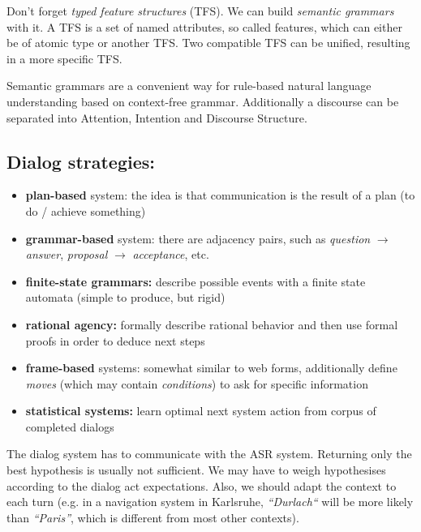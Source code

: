 \vspace{5pt}

Don't forget \textit{typed feature structures} (TFS). We can build \textit{semantic grammars} with it.
A TFS is a set of named attributes, so called features, which can either be of atomic type or another TFS.
Two compatible TFS can be unified, resulting in a more specific TFS.

Semantic grammars are a convenient way for rule-based natural language understanding based on context-free grammar.
Additionally a discourse can be separated into Attention, Intention and Discourse Structure.

\subsection{Dialog strategies:}
\begin{itemize}
    \item \textbf{plan-based} system: the idea is that communication is the result of a plan (to do / achieve something)
    \item \textbf{grammar-based} system: there are adjacency pairs, such as \textit{question} $\rightarrow$ \textit{answer}, \textit{proposal} $\rightarrow$ \textit{acceptance}, etc.
    \item \textbf{finite-state grammars:} describe possible events with a finite state automata (simple to produce, but rigid)
    \item \textbf{rational agency:} formally describe rational behavior and then use formal proofs in order to deduce next steps
    \item \textbf{frame-based} systems: somewhat similar to web forms, additionally define \textit{moves} (which may contain \textit{conditions}) to ask for specific information
    \item \textbf{statistical systems:} learn optimal next system action from corpus of completed dialogs
\end{itemize}

\vspace{5pt}

The dialog system has to communicate with the ASR system. Returning only the best hypothesis is usually not sufficient. We may have to weigh hypothesises according to the dialog act expectations. Also, we should adapt the context to each turn (e.g. in a navigation system in Karlsruhe, \textit{``Durlach``} will be more likely than \textit{``Paris''}, which is different from most other contexts).

